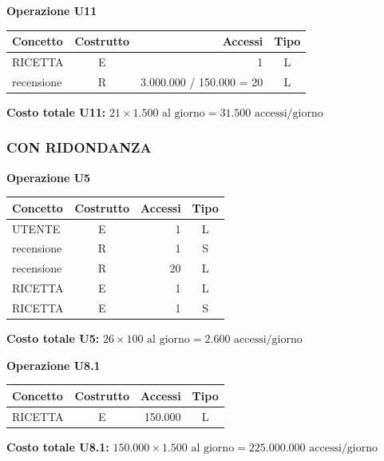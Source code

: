 \vspace{1.5em}

\noindent\textbf{Operazione U11}
\begin{table}[H]
\centering
\renewcommand{\arraystretch}{1.2}
\setlength{\tabcolsep}{8pt}
\begin{tabularx}{\textwidth}{|X|c|r|c|}
\hline
\textbf{Concetto} & \textbf{Costrutto} & \textbf{Accessi} & \textbf{Tipo} \\
\hline
RICETTA & E & 1 & L \\
\hline
recensione & R & 3.000.000 / 150.000 = 20 & L \\
\hline
\end{tabularx}
\end{table}
\textbf{Costo totale U11:} $21 \times 1.500 \mbox{ al giorno} = 31.500 \mbox{ accessi/giorno}$

\vspace{2em}

\subsubsection*{CON RIDONDANZA}

\noindent\textbf{Operazione U5}
\begin{table}[H]
\centering
\renewcommand{\arraystretch}{1.2}
\setlength{\tabcolsep}{8pt}
\begin{tabularx}{\textwidth}{|X|c|r|c|}
\hline
\textbf{Concetto} & \textbf{Costrutto} & \textbf{Accessi} & \textbf{Tipo} \\
\hline
UTENTE & E & 1 & L \\
\hline
recensione & R & 1 & S \\
\hline
recensione & R & 20 & L \\
\hline
RICETTA & E & 1 & L \\
\hline
RICETTA & E & 1 & S \\
\hline
\end{tabularx}
\end{table}
\textbf{Costo totale U5:} $26 \times 100 \mbox{ al giorno} = 2.600 \mbox{ accessi/giorno}$

\vspace{1.5em}

\noindent\textbf{Operazione U8.1}
\begin{table}[H]
\centering
\renewcommand{\arraystretch}{1.2}
\setlength{\tabcolsep}{8pt}
\begin{tabularx}{\textwidth}{|X|c|r|c|}
\hline
\textbf{Concetto} & \textbf{Costrutto} & \textbf{Accessi} & \textbf{Tipo} \\
\hline
RICETTA & E & 150.000 & L \\
\hline
\end{tabularx}
\end{table}
\textbf{Costo totale U8.1:} $150.000 \times 1.500 \mbox{ al giorno} = 225.000.000 \mbox{ accessi/giorno}$

